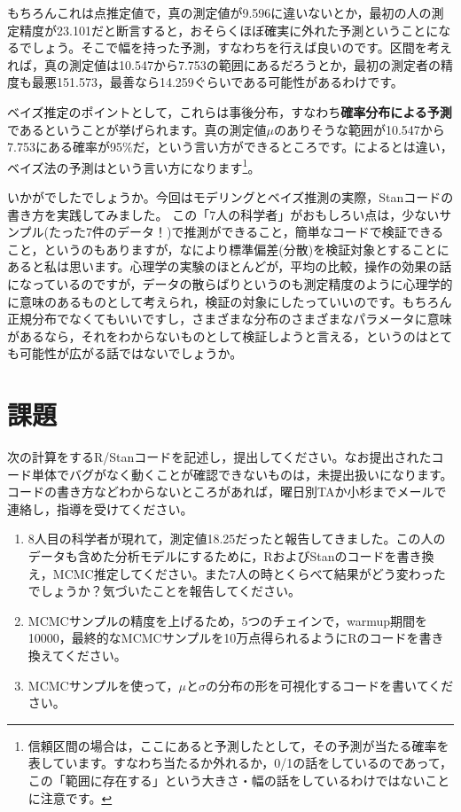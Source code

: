 \documentclass{ltjsbook}
\begin{document}
もちろんこれは点推定値で，真の測定値が9.596に違いないとか，最初の人の測定精度が23.101だと断言すると，おそらくほぼ確実に外れた予測ということになるでしょう。そこで幅を持った予測，すなわちを行えば良いのです。区間を考えれば，真の測定値は10.547から7.753の範囲にあるだろうとか，最初の測定者の精度も最悪151.573，最善なら14.259ぐらいである可能性があるわけです。

ベイズ推定のポイントとして，これらは事後分布，すなわち\textbf{確率分布による予測}であるということが挙げられます。真の測定値$\mu$のありそうな範囲が10.547から7.753にある確率が95\%だ，という言い方ができるところです。によるとは違い，ベイズ法の予測はという言い方になります\footnote{信頼区間の場合は，ここにあると予測したとして，その予測が当たる確率を表しています。すなわち当たるか外れるか，0/1の話をしているのであって，この「範囲に存在する」という大きさ・幅の話をしているわけではないことに注意です。}。

いかがでしたでしょうか。今回はモデリングとベイズ推測の実際，Stanコードの書き方を実践してみました。
この「7人の科学者」がおもしろい点は，少ないサンプル(たった7件のデータ！)で推測ができること，簡単なコードで検証できること，というのもありますが，なにより標準偏差(分散)を検証対象とすることにあると私は思います。心理学の実験のほとんどが，平均の比較，操作の効果の話になっているのですが，データの散らばりというのも測定精度のように心理学的に意味のあるものとして考えられ，検証の対象にしたっていいのです。もちろん正規分布でなくてもいいですし，さまざまな分布のさまざまなパラメータに意味があるなら，それをわからないものとして検証しようと言える，というのはとても可能性が広がる話ではないでしょうか。
\section{課題}
次の計算をするR/Stanコードを記述し，提出してください。なお提出されたコード単体でバグがなく動くことが確認できないものは，未提出扱いになります。コードの書き方などわからないところがあれば，曜日別TAか小杉までメールで連絡し，指導を受けてください。
\begin{enumerate}
	\item 8人目の科学者が現れて，測定値18.25だったと報告してきました。この人のデータも含めた分析モデルにするために，RおよびStanのコードを書き換え，MCMC推定してください。また7人の時とくらべて結果がどう変わったでしょうか？気づいたことを報告してください。
	\item MCMCサンプルの精度を上げるため，5つのチェインで，warmup期間を10000，最終的なMCMCサンプルを10万点得られるようにRのコードを書き換えてください。
	\item MCMCサンプルを使って，$\mu$と$\sigma$の分布の形を可視化するコードを書いてください。
\end{enumerate}
\end{document}
